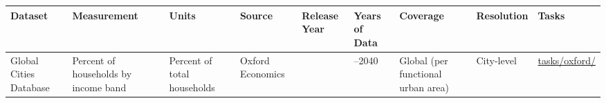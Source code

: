 \documentclass[
  letterpaper,
  DIV=11,
  numbers=noendperiod]{scrreprt}
\newcounter{none} %
\begin{document}
{\def\LTcaptype{none} %
\begin{longtable}[]{@{}
  >{\raggedright\arraybackslash}p{}
  >{\raggedright\arraybackslash}p{}
  >{\raggedright\arraybackslash}p{}
  >{\raggedright\arraybackslash}p{}
  >{\raggedright\arraybackslash}p{}
  >{\raggedright\arraybackslash}p{}
  >{\raggedright\arraybackslash}p{}
  >{\raggedright\arraybackslash}p{}
  >{\raggedright\arraybackslash}p{}@{}}
\toprule\noalign{}
\begin{minipage}[b]{\linewidth}\raggedright
Dataset
\end{minipage} & \begin{minipage}[b]{\linewidth}\raggedright
Measurement
\end{minipage} & \begin{minipage}[b]{\linewidth}\raggedright
Units
\end{minipage} & \begin{minipage}[b]{\linewidth}\raggedright
Source
\end{minipage} & \begin{minipage}[b]{\linewidth}\raggedright
Release Year
\end{minipage} & \begin{minipage}[b]{\linewidth}\raggedright
Years of Data
\end{minipage} & \begin{minipage}[b]{\linewidth}\raggedright
Coverage
\end{minipage} & \begin{minipage}[b]{\linewidth}\raggedright
Resolution
\end{minipage} & \begin{minipage}[b]{\linewidth}\raggedright
Tasks
\end{minipage} \\
\midrule\noalign{}
\endhead
\bottomrule\noalign{}
\endlastfoot
Global Cities Database & Percent of households by income band & Percent
of total households & Oxford Economics & 2022 & 2000--2040 & Global (per
functional urban area) & City-level &
\href{../tasks/oxford/}{tasks/oxford/} \\
\end{longtable}
}
\end{document}
